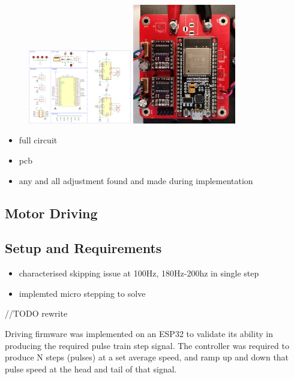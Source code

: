 \begin{figure}[h]
    \centering
    \includegraphics[width=0.4\textwidth]{img/schem.png}
    \includegraphics[width=0.4\textwidth]{img/control_pcb.jpg}
\end{figure}

\begin{itemize}
    \item full circuit
    \item pcb
    \item any and all adjustment found and made during implementation
\end{itemize}

\subsection{Motor Driving}

\subsection{Setup and Requirements}

\begin{itemize}
    \item characterised skipping issue at 100Hz, 180Hz-200hz in single step
    \item implemted micro stepping to solve
\end{itemize}

//TODO rewrite

Driving firmware was implemented on an ESP32 to validate its ability in producing the required pulse train step signal. The controller was required to produce N steps (pulses) at a set average speed, and ramp up and down that pulse speed at the head and tail of that signal.

